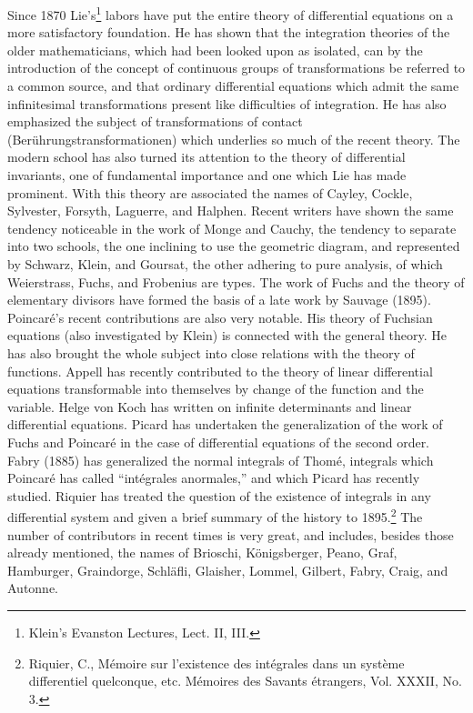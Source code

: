 \documentclass[oneside]{book}
\begin{document}
Since 1870 Lie's\footnote{Klein's Evanston Lectures, Lect. II,
III.} labors have put the entire theory of differential equations
on a more satisfactory foundation. He has shown that the integration
theories of the older mathematicians, which had been looked upon as
isolated, can by the introduction of the concept of continuous
groups of transformations be referred to a common source, and that
ordinary differential equations which admit the same infinitesimal
transformations present like difficulties of integration. He has
also emphasized the subject of transformations of contact
(Ber\"uhrungstransformationen) which underlies so much of the recent
theory. The modern school has also turned its attention to the
theory of differential invariants, one of fundamental importance and
one which Lie has made prominent. With this theory are associated
the names of Cayley, Cockle, Sylvester, Forsyth, Laguerre, and
Halphen. Recent writers have shown the same tendency noticeable in
the work of Monge and Cauchy, the tendency to separate into two
schools, the one inclining to use the geometric diagram, and
represented by Schwarz, Klein, and Goursat, the other adhering to
pure analysis, of which Weierstrass, Fuchs, and Frobenius are
types. The work of Fuchs and the theory of elementary divisors have
formed the basis of a late work by Sauvage (1895). Poincar\'e's
recent contributions are also very notable. His theory of Fuchsian
equations (also investigated by Klein) is connected with the general
theory. He has also brought the whole subject into close relations
with the theory of functions. Appell has recently contributed to the
theory of linear differential equations transformable into
themselves by change of the function and the variable. Helge von
Koch has written on infinite determinants and linear differential
equations. Picard has undertaken the generalization of the work of
Fuchs and Poincar\'e in the case of differential equations of the
second order. Fabry (1885) has generalized the normal integrals of
Thom\'e, integrals which Poincar\'e has called ``int\'egrales
anormales,'' and which Picard has recently studied. Riquier has
treated the question of the existence of integrals in any
differential system and given a brief summary of the history to
1895.\footnote{Riquier, C., M\'emoire sur l'existence des
int\'egrales dans un syst\`eme differentiel quelconque,
etc. M\'emoires des Savants \'etrangers, Vol. XXXII, No. 3.} The
number of contributors in recent times is very great, and includes,
besides those already mentioned, the names of Brioschi,
K\"onigsberger, Peano, Graf, Hamburger, Graindorge, Schl\"afli,
Glaisher, Lommel, Gilbert, Fabry, Craig, and Autonne.
\end{document}
